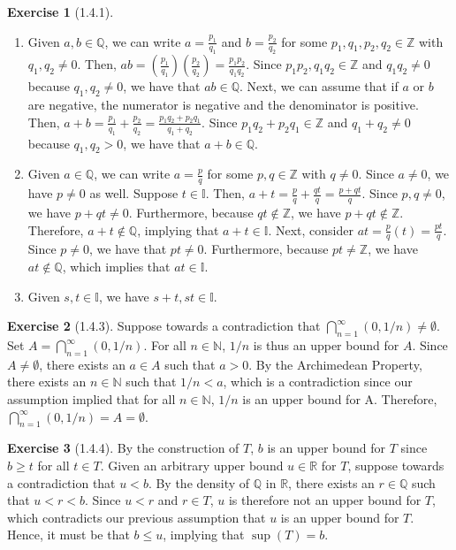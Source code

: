 \documentclass{amsart}
\theoremstyle{definition}
\newtheorem{exercise}{Exercise}
\newcommand{\N}{\mathbb{N}}
\newcommand{\Z}{\mathbb{Z}}
\newcommand{\Q}{\mathbb{Q}}
\newcommand{\I}{\mathbb{I}}
\newcommand{\R}{\mathbb{R}}
\begin{document}
\begin{exercise}[1.4.1]
  \begin{enumerate}[label={(\alph*)}]
    \item Given $a, b \in \Q$, we can write $a = \frac{p_1}{q_1}$ and $b =
      \frac{p_2}{q_2}$ for some $p_1, q_1, p_2, q_2 \in \Z$ with $q_1, q_2 \neq
      0$.  Then, $ab = (\frac{p_1}{q_1}) (\frac{p_2}{q_2}) = \frac{p_1 p_2}{q_1
      q_2}$. Since $p_1 p_2, q_1 q_2 \in \Z$ and $q_1 q_2 \neq 0$ because $q_1,
      q_2 \neq 0$, we have that $ab \in \Q$. Next, we can assume that if $a$ or
      $b$ are negative, the numerator is negative and the denominator is
      positive. Then, $a + b = \frac{p_1}{q_1} + \frac{p_2}{q_2} = \frac{p_1 q_2
      + p_2 q_1}{q_1 + q_2}$.  Since $p_1 q_2 + p_2 q_1 \in \Z$ and $q_1 + q_2
      \neq 0$ because $q_1, q_2 > 0$, we have that $a + b \in \Q$.
    \item Given $a \in \Q$, we can write $a = \frac{p}{q}$ for some $p, q \in
      \Z$ with $q \neq 0$. Since $a \neq 0$, we have $p \neq 0$ as well.
      Suppose $t \in \I$. Then, $a + t = \frac{p}{q} + \frac{qt}{q} = \frac{p +
      qt}{q}$. Since $p, q \neq 0$, we have $p + qt \neq 0$. Furthermore,
      because $qt \notin \Z$, we have $p + qt \notin \Z$. Therefore, $a + t
      \notin \Q$, implying that $a + t \in \I$.  Next, consider $at =
      \frac{p}{q} (t) = \frac{pt}{q}$. Since $p \neq 0$, we have that $pt \neq
      0$. Furthermore, because $pt \neq \Z$, we have $at \notin \Q$, which
      implies that $at \in \I$.
    \item Given $s, t \in \I$, we have $s + t, st \in \I$.
  \end{enumerate}
\end{exercise}

\begin{exercise}[1.4.3]
  Suppose towards a contradiction that $\bigcap_{n=1}^{\infty} (0, 1/n) \neq
  \emptyset$. Set $A = \bigcap_{n=1}^{\infty} (0, 1/n)$. For all $n \in \N$,
  $1/n$ is thus an upper bound for $A$. Since $A \neq \emptyset$, there exists
  an $a \in A$ such that $a > 0$. By the Archimedean Property, there exists an
  $n \in \N$ such that $1/n < a$, which is a contradiction since our assumption
  implied that for all $n \in \N$, $1/n$ is an upper bound for A. Therefore,
  $\bigcap_{n=1}^{\infty} (0, 1/n) = A = \emptyset$.
\end{exercise}

\begin{exercise}[1.4.4]
  By the construction of $T$, $b$ is an upper bound for $T$ since $b \ge t$ for
  all $t \in T$. Given an arbitrary upper bound $u \in \R$ for $T$, suppose
  towards a contradiction that $u < b$. By the density of $\Q$ in $\R$, there
  exists an $r \in \Q$ such that $u < r < b$. Since $u < r$ and $r \in T$, $u$
  is therefore not an upper bound for $T$, which contradicts our previous
  assumption that $u$ is an upper bound for $T$. Hence, it must be that $b \le
  u$, implying that $\sup(T) = b$.
\end{exercise}
\end{document}
